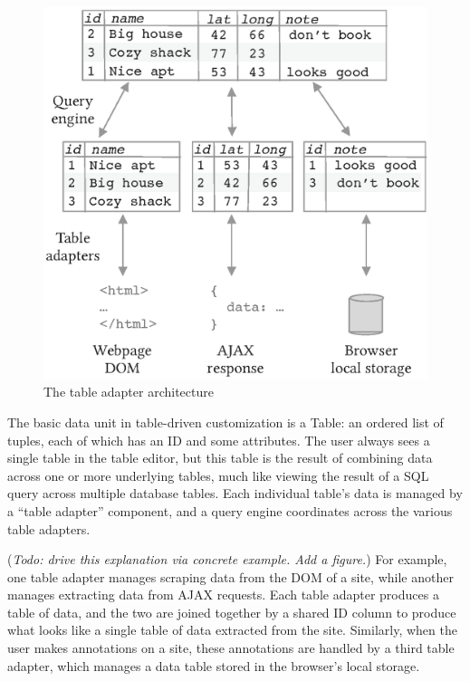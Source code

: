 \documentclass[sigplan,10pt,anonymous,review]{acmart}
\begin{document}
\begin{figure}
\hypertarget{fig:table-adapter}{%
\centering
\includegraphics[width=\columnwidth]{media/table-adapter.eps}
\caption{The table adapter architecture}\label{fig:table-adapter}
}
\end{figure}

The basic data unit in table-driven customization is a Table: an ordered
list of tuples, each of which has an ID and some attributes. The user
always sees a single table in the table editor, but this table is the
result of combining data across one or more underlying tables, much like
viewing the result of a SQL query across multiple database tables. Each
individual table's data is managed by a ``table adapter'' component, and
a query engine coordinates across the various table adapters.

(\emph{Todo: drive this explanation via concrete example. Add a
figure.}) For example, one table adapter manages scraping data from the
DOM of a site, while another manages extracting data from AJAX requests.
Each table adapter produces a table of data, and the two are joined
together by a shared ID column to produce what looks like a single table
of data extracted from the site. Similarly, when the user makes
annotations on a site, these annotations are handled by a third table
adapter, which manages a data table stored in the browser's local
storage.
\end{document}
